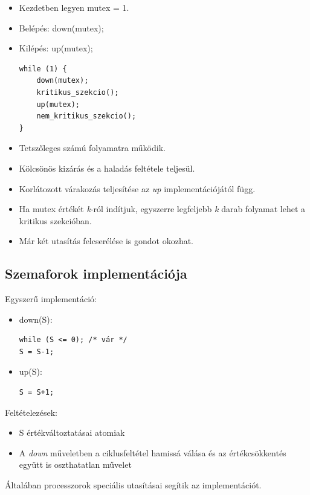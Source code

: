 \documentclass[tikz,12pt,margin=0px]{article}
\begin{document}
    \begin{itemize}[topsep=8pt,itemsep=4pt,partopsep=4pt, parsep=4pt]
        \item Kezdetben legyen mutex = 1.
        \item Belépés: down(mutex);
        \item Kilépés: up(mutex);
        \begin{verbatim}
while (1) {
    down(mutex);
    kritikus_szekcio();
    up(mutex);
    nem_kritikus_szekcio();
}
        \end{verbatim}
        \item Tetszőleges számú folyamatra működik.
        \item Kölcsönös kizárás és a haladás feltétele teljesül.
        \item Korlátozott várakozás teljesítése az \emph{up} implementációjától függ.
        \item Ha mutex értékét \emph{k}-ról indítjuk, egyszerre legfeljebb \emph{k} darab folyamat lehet a kritikus szekcióban.
        \item Már két utasítás felcserélése is gondot okozhat.
    \end{itemize}

    \subsection*{Szemaforok implementációja}

    Egyszerű implementáció:
    \begin{itemize}[topsep=8pt,itemsep=4pt,partopsep=4pt, parsep=4pt]
        \item down(S):
        \begin{verbatim}
while (S <= 0); /* vár */
S = S-1;
        \end{verbatim}
        \item up(S):
        \begin{verbatim}
S = S+1;
        \end{verbatim}
    \end{itemize}
    \noindent Feltételezések:
    \begin{itemize}
            \item S értékváltoztatásai atomiak
            \item A \emph{down} műveletben a ciklusfeltétel hamissá válása és az értékcsökkentés együtt is oszthatatlan művelet
    \end{itemize}

    \noindent Általában processzorok speciális utasításai segítik az implementációt.\\
\end{document}
